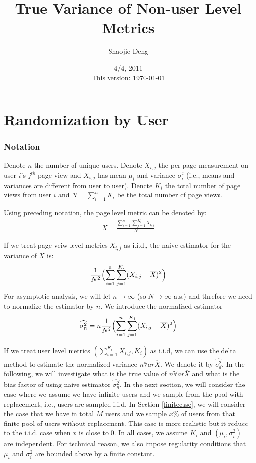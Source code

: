 \documentclass[12pt,letterpaper]{article}
\newcommand{\wht}{\widehat}
\newcommand{\var}{\ensuremath{\mathbb Var}}
\renewcommand{\labelenumi}{\roman{enumi}}
\newcommand{\xbar}{\overline{X}}
\newcommand{\Xij}{X_{i,j}}
\newcommand{\naiveest}{\wht{\sigma^2_n}}
\begin{document}
\renewcommand{\labelenumi}{\arabic{enumi}.}
\renewcommand{\baselinestretch}{1.05} \small \normalsize
\title{True Variance of Non-user Level Metrics}
\author{Shaojie Deng}
\date{4/4, 2011\\ This version: \today}
\maketitle
\part{Randomization by User}
\section{Notation}
Denote $n$ the number of unique users. Denote $X_{i,j}$ the per-page measurement on user $i$'s $j^{th}$ page view and $X_{i,j}$ has mean $\mu_i$ and variance $\sigma_i^2$ (i.e., means and variances are different from user to user). Denote $K_i$ the total number of page views from user $i$ and $N = \sum_{i=1}^n K_i$ be the total number of page views.   

Using preceding notation, the page level metric can be denoted by:
\begin{align}
\xbar= \frac{\sum_{i=1}^n\sum_{j=1}^{K_i} X_{i,j}}{N}
\end{align}

If we treat page veiw level metrics $X_{i,j}$ as i.i.d., the naive estimator for the variance of $\overline{X}$ is:
\begin{align}
\frac{1}{N^2} \Bigl (\sum_{i=1}^n \sum_{j=1}^{K_i} (X_{i,j}-\overline{X})^2 \Bigr )
\end{align}
For asymptotic analysis, we will let $n\to \infty$ (so $N\to \infty$ a.s.) and threfore we need to normalize the estimator by $n$.  We introduce the normalized estimator 
\begin{align}
\wht{\sigma^2_n} = n\frac{1}{N^2} \Bigl (\sum_{i=1}^n \sum_{j=1}^{K_i} (X_{i,j}-\overline{X})^2 \Bigr )
\end{align}

If we treat user level metrics $(\sum_{i=1}^{K_i} \Xij , K_i)$ as i.i.d,  we can use the delta method to estimate the normalized variance $n\var \xbar$. We denote it by $\wht{\sigma^2_d}$. 
In the following, we will investigate what is the true value of $n\var \xbar$ and what is the bias factor of using naive estimator $\naiveest$. In the next section, we will consider the case where we assume we have infinite users and we sample from the pool with replacement, i.e., users are sampled i.i.d. 
In Section \ref{finitecase}, we will consider the case that we have in total $M$ users and we sample $x\%$ of users from that finite pool of users without replacement. This case is more realistic but it reduce to the i.i.d. case when $x$ is close to 0. In all cases, we assume $K_i$ and $(\mu_i, \sigma^2_i)$ are independent. For technical reason, we also impose regularity conditions that $\mu_i$ and $\sigma^2_i$ are bounded above by a finite constant. 
\end{document}

